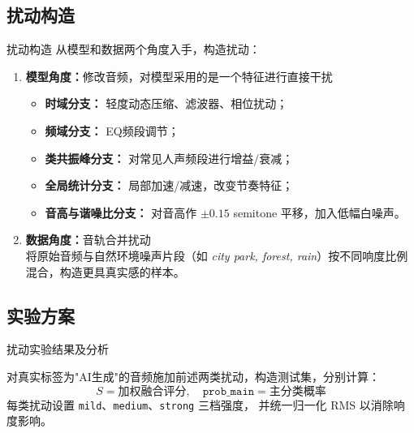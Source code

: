 \documentclass[aspectratio=169]{beamer}
\begin{document}
\subsection{扰动构造}
\begin{frame}{扰动构造}
从模型和数据两个角度入手，构造扰动：
\begin{enumerate}
\item \textbf{模型角度：}修改音频，对模型采用的是一个特征进行直接干扰
  \begin{itemize}
    \item \textbf{时域分支：} 轻度动态压缩、滤波器、相位扰动；
    \item \textbf{频域分支：} EQ频段调节；
    \item \textbf{类共振峰分支：} 对常见人声频段进行增益/衰减；
    \item \textbf{全局统计分支：} 局部加速/减速，改变节奏特征；
    \item \textbf{音高与谐噪比分支：} 对音高作 $\pm 0.15$ semitone 平移，加入低幅白噪声。
  \end{itemize}

\item \textbf{数据角度：}音轨合并扰动\\
  将原始音频与自然环境噪声片段（如 \emph{city park, forest, rain}）按不同响度比例混合，构造更具真实感的样本。
\end{enumerate}

\end{frame}

\subsection{实验方案}
\begin{frame}{扰动实验结果及分析}

对真实标签为"AI生成"的音频施加前述两类扰动，构造测试集，分别计算：
\[
S = \text{加权融合评分}, \quad \texttt{prob\_main} = \text{主分类概率}
\]
  每类扰动设置 \texttt{mild}、\texttt{medium}、\texttt{strong} 三档强度，
  并统一归一化 RMS 以消除响度影响。
\end{frame}
\end{document}
